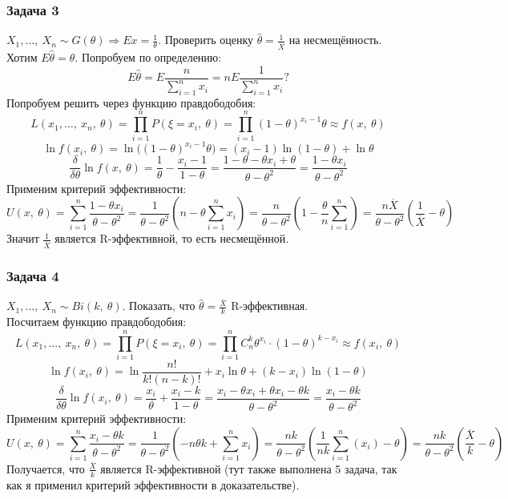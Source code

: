 \documentclass[12pt, a4paper]{article}
\begin{document}
\subsubsection*{Задача 3}
$X_1,\dots,\ X_n \sim G(\theta)\Rightarrow Ex = \frac{1}{\theta}$. Проверить оценку $\hat{\theta} = \frac{1}{\overline{X}}$ на несмещённость.\\
Хотим $E\hat{\theta} = \theta$. Попробуем по определению:
\[E\hat{\theta} = E \frac{n}{\sum\limits_{i = 1}^{n} x_i} = n E\frac{1}{\sum\limits_{i = 1}^{n} x_i}?\]
Попробуем решить через функцию правдободобия:
\[L(x_1,\dots,\ x_n,\ \theta) = \prod_{i = 1}^{n} P(\xi = x_i,\ \theta) = \prod_{i = 1}^{n} (1 - \theta)^{x_i - 1}\theta \approx f(x,\ \theta)\]
\[\ln f(x_i,\ \theta) = \ln \big( (1 - \theta)^{x_i - 1} \theta \big) = (x_i - 1)\ln (1 - \theta) + \ln \theta\]
\[\frac{\delta}{\delta \theta} \ln f(x,\ \theta) = \frac{1}{\theta} - \frac{x_i - 1}{1 - \theta} = \frac{1 - \theta - \theta x_i + \theta}{\theta - \theta^2} = \frac{1 - \theta x_i}{\theta - \theta^2}\]
Применим критерий эффективности:
\[U(x,\ \theta) = \sum_{i = 1}^{n} \frac{1 - \theta x_i}{\theta - \theta^2} = \frac{1}{\theta - \theta^2} \left( n - \theta \sum_{i = 1}^{n} x_i \right) = \frac{n}{\theta - \theta^2} \left( 1 - \frac{\theta}{n} \sum_{i = 1}^{n} \right) = \frac{n\overline{X}}{\theta - \theta^2} \left( \frac{1}{\overline{X}} - \theta \right)\]
Значит $\frac{1}{\overline{X}}$ является R-эффективной, то есть несмещённой.
\subsubsection*{Задача 4}
$X_1,\dots,\ X_n \sim Bi(k,\ \theta)$. Показать, что $\hat{\theta}  = \frac{\overline{X}}{k}$ R-эффективная.\\
Посчитаем функцию правдободобия:
\[L(x_1,\dots,\ x_n,\ \theta) = \prod_{i = 1}^{n} P(\xi = x_i,\ \theta) = \prod_{i = 1}^{n} C_n^k\theta^{x_i}\cdot (1 - \theta)^{k - x_i} \approx f(x_i,\ \theta)\]
\[\ln f(x_i,\ \theta) = \ln\frac{n!}{k!(n - k)!} + x_i \ln \theta + (k - x_i)\ln (1 - \theta)\]
\[\frac{\delta}{\delta \theta} \ln f(x_i,\ \theta) = \frac{x_i}{\theta} + \frac{x_i - k}{1 - \theta} = \frac{x_i - \theta x_i + \theta x_i - \theta k}{\theta - \theta^2} = \frac{x_i - \theta k}{\theta - \theta^2}\]
Применим критерий эффективности:
\[U(x,\ \theta) = \sum_{i = 1}^{n} \frac{x_i - \theta k}{\theta - \theta^2} = \frac{1}{\theta - \theta^2}\left(-n\theta k + \sum_{i = 1}^{n} x_i\right) = \frac{nk}{\theta - \theta^2}\left( \frac{1}{nk} \sum_{i = 1}^{n} (x_i) - \theta \right) = \frac{nk}{\theta - \theta^2} \left( \frac{\overline{X}}{k} - \theta \right)\]
Получается, что $\frac{\overline{X}}{k}$ является R-эффективной (тут также выполнена 5 задача, так как я применил критерий эффективности в доказательстве).
\end{document}
